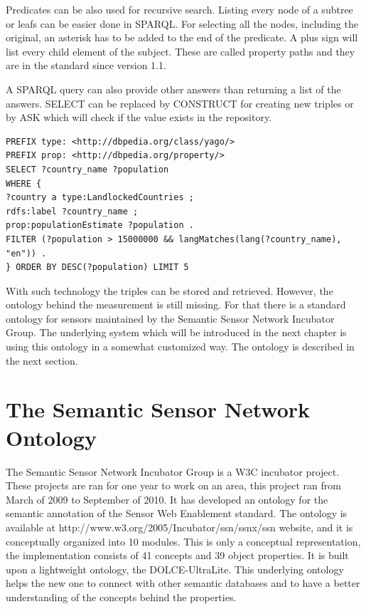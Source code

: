 Predicates can be also used for recursive search. Listing every node of a subtree or leafs can be easier done in SPARQL. For selecting all the nodes, including the original, an asterisk has to be added to the end of the predicate. A plus sign will list every child element of the subject. These are called property paths and they are in the standard since version 1.1.

A SPARQL query can also provide other answers than returning a list of the answers. SELECT can be replaced by CONSTRUCT for creating new triples or by ASK which will check if the value exists in the repository. 


\begin{lstlisting}[caption={Sample complex SPARQL which shows top 5 countries based on population using DBpedia\label{lst:sparqlcomplex}}]
PREFIX type: <http://dbpedia.org/class/yago/>
PREFIX prop: <http://dbpedia.org/property/>
SELECT ?country_name ?population
WHERE {
?country a type:LandlockedCountries ;
rdfs:label ?country_name ;
prop:populationEstimate ?population .
FILTER (?population > 15000000 && langMatches(lang(?country_name), "en")) .
} ORDER BY DESC(?population) LIMIT 5
\end{lstlisting}

With such technology the triples can be stored and retrieved. However, the ontology behind the measurement is still missing. For that there is a standard ontology for sensors maintained by the Semantic Sensor Network Incubator Group. The underlying system which will be introduced in the next chapter is using this ontology in a somewhat customized way\cite{g2d2}.  The ontology is described in the next section.

\section{The Semantic Sensor Network Ontology}

The Semantic Sensor Network Incubator Group is a W3C incubator project. These projects are ran for one year to work on an area, this project ran from March of 2009 to September of 2010. It has developed an ontology for the semantic annotation of the Sensor Web Enablement standard. The ontology is available at http://www.w3.org/2005/Incubator/ssn/ssnx/ssn website, and it is conceptually organized into 10 modules. This is only a conceptual representation, the implementation consists of 41 concepts and 39 object properties. It is built upon a lightweight ontology, the  DOLCE-UltraLite. This underlying ontology helps the new one to connect with other semantic databases and to have a better understanding of the concepts behind the properties. 


